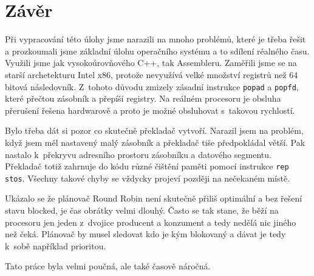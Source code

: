 \documentclass[a4paper,12pt]{article}
\begin{document}
\section{Závěr}
Při vypracování této úlohy jsme narazili na mnoho problémů, které je třeba
řešit a prozkoumali jsme základní úlohu operačního systému a to sdílení réalného času.
Využili jsme jak vysokoúrovňového C++, tak Assembleru. Zaměřili jsme se na starší
archetekturu Intel x86, protože nevyužívá velké množství registrů než 64 bitová
následovník. Z~tohoto důvodu zmizely zásadní instrukce \texttt{popad} a \texttt{popfd},
které přečtou zásobník a přepíší registry. Na reálném procesoru je obsluha přerušení řešena
hardwarově a proto je možné obsluhovat s~takovou rychlostí.

Bylo třeba dát si pozor co skutečně překladač vytvoří. Narazil jsem na problém, když jsem
měl nastavený malý zásobník a překladač tiše předpokládal větší. Pak nastalo k~překryvu
adresního prostoru zásobníku a datového segmentu. Překladač totiž zahrnuje do kódu různé
čištění paměti pomocí instrukce \verb+rep stos+. Všechny takové chyby se vždycky projeví
později na nečekaném místě.

Ukázalo se že plánovač Round Robin není skutečně přiliš optimální a bez řešení stavu
blocked, je čas obrátky velmi dlouhý. Často se tak stane, že běží na procesoru jen jeden
z~dvojice producent a konzument a tedy nedělá nic jiného než čeká. Plánovač by musel
sledovat kdo je kým blokovaný a dávat je tedy k~sobě například prioritou.

Tato práce byla velmi poučná, ale také časově náročná.
\end{document}
